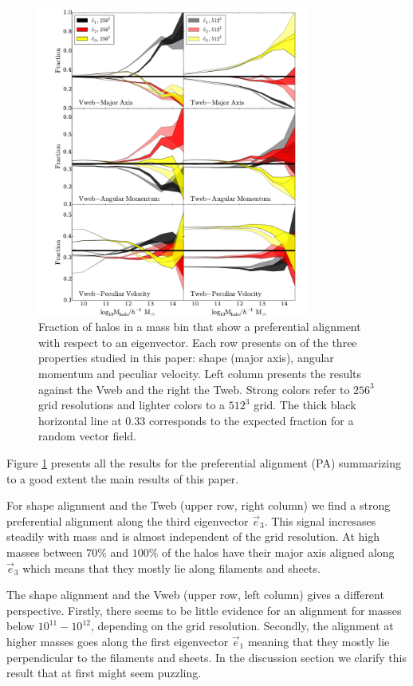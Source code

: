 \documentclass[useAMS,usenatbib]{mn2e}
\newcommand{\hMsun}{{\ifmmode{h^{-1}{\rm
        {M_{\odot}}}}\else{$h^{-1}{\rm{M_{\odot}}}$}\fi}}
\begin{document}
\begin{figure}
\includegraphics[width=0.8\textwidth]{Fig0.pdf}
\caption{Fraction of halos in a mass bin that show a preferential
  alignment with respect to an eigenvector. Each row presents on of
  the three properties studied in this paper: shape (major axis),
  angular momentum and  peculiar velocity. Left column presents the
  results against the Vweb   and the right the Tweb. Strong colors
  refer to $256^3$ grid resolutions and lighter colors to a $512^3$
  grid. The thick black horizontal line at $0.33$ corresponds to the
  expected fraction for a random vector field.
\label{fig:preferential}}
\end{figure}

Figure \ref{fig:preferential} presents all the results for the
preferential alignment (PA) summarizing to a good extent the main
results of this paper. 

For shape alignment and the Tweb (upper row, right column) we find a strong
preferential alignment along the third eigenvector $\vec{e}_{3}$. This
signal incresases steadily with mass and is almost independent of the
grid resolution. At high masses between $70\%$ and $100\%$ of the
halos have their major axis aligned along $\vec{e}_{3}$ which means
that they mostly lie along filaments and sheets. 

The shape alignment and the Vweb (upper row, left column) gives a
different perspective. Firstly, there seems to be little evidence
for an alignment for masses below $10^{11}-10^{12}$\hMsun, depending
on the grid resolution. Secondly, the alignment at higher masses goes
along the first eigenvector $\vec{e}_{1}$ meaning that they mostly lie
perpendicular to the filaments and sheets. In the discussion section
we clarify this result that at first might seem puzzling.
\end{document}
